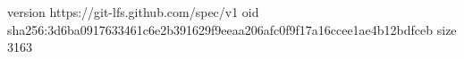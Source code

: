 version https://git-lfs.github.com/spec/v1
oid sha256:3d6ba0917633461c6e2b391629f9eeaa206afc0f9f17a16ccee1ae4b12bdfceb
size 3163
